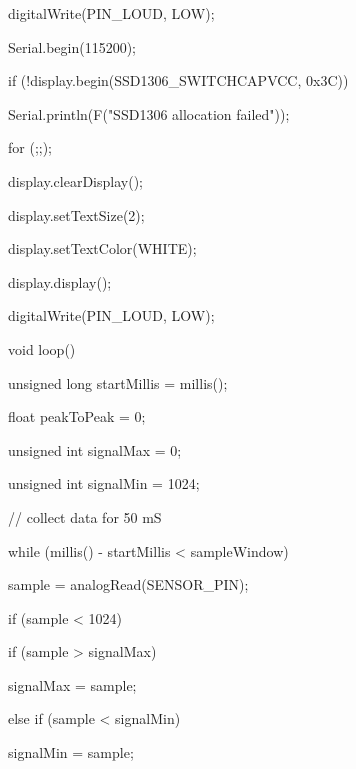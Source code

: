 \begin{Arduino}
{		digitalWrite(PIN_LOUD, LOW);
		
		
		
		Serial.begin(115200);
		
		
		
		if (!display.begin(SSD1306_SWITCHCAPVCC, 0x3C)) {
			
			Serial.println(F("SSD1306 allocation failed"));
			
			for (;;); 
			
		}
		
		
		
		display.clearDisplay();
		
		display.setTextSize(2);
		
		display.setTextColor(WHITE);
		
		display.display();
		
		digitalWrite(PIN_LOUD, LOW);
		
	}
	
	
	
	void loop()
	
	{
		
		unsigned long startMillis = millis();                  
		
		float peakToPeak = 0;                                  
		
		
		
		unsigned int signalMax = 0;                            
		
		unsigned int signalMin = 1024;                         
		
		
		
		// collect data for 50 mS
		
		while (millis() - startMillis < sampleWindow)
		
		{
			
			sample = analogRead(SENSOR_PIN);
			
			
			
			if (sample < 1024)                                  
			
			{
				
				if (sample > signalMax)
				
				{
					
					signalMax = sample;                          
					
				}
				
				else if (sample < signalMin)
				
				{
					
					signalMin = sample;                           
					
}}}}
\end{Arduino}
